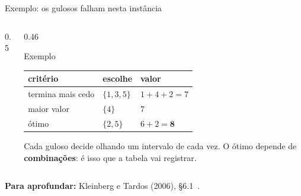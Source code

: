 \documentclass[aspectratio=169,xcolor=table]{beamer}
\newcommand{\intervalo}[5]{%
  \draw[line width=2.4mm, #5] (#2,-#1*0.42) -- (#3,-#1*0.42);
  \node[font=\tiny, anchor=west] at (#3+0.1,-#1*0.42) {#4};%
}
\newcommand{\fonte}[1]{%
  \vfill
  {\tiny\color{gray!55!black}\textbf{Para aprofundar:} #1\par}%
}
\begin{document}
\begin{frame}{Exemplo: os gulosos falham nesta instância}
  \begin{columns}[c]
    \begin{column}{0.5\textwidth}
      \centering
    \end{column}
    \begin{column}{0.46\textwidth}
      \begin{exampleblock}{Exemplo}
        \scriptsize
        \begin{tabular}{lll}
          \toprule
          critério & escolhe & valor \\
          \midrule
          \textcolor{orange!80!black}{termina mais cedo} & $\{1,3,5\}$ & $1+4+2=7$ \\
          \textcolor{red!70!black}{maior valor} & $\{4\}$ & $7$ \\
          \textcolor{green!50!black}{ótimo} & $\{2,5\}$ & $6+2=\mathbf{8}$ \\
          \bottomrule
        \end{tabular}
        \medskip

        Cada guloso decide olhando um intervalo de cada vez. O ótimo depende de
        \textbf{combinações}: é isso que a tabela vai registrar.
      \end{exampleblock}
    \end{column}
  \end{columns}
  \fonte{Kleinberg e Tardos (2006), \S 6.1~\cite{kleinberg2006algorithm}.}
\end{frame}
\end{document}
